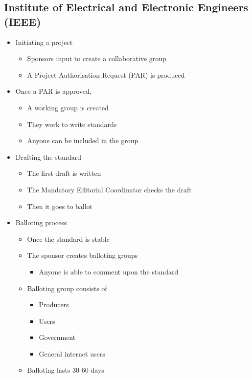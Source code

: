 \subsection*{Institute of Electrical and Electronic Engineers (IEEE)}

\begin{itemize}
  \item Initiating a project
  \begin{itemize}
    \item Sponsors input to create a collaborative group
    \item A Project Authorisation Request (PAR) is produced
  \end{itemize}
  \item Once a PAR is approved,
  \begin{itemize}
    \item A working group is created
    \item They work to write standards
    \item Anyone can be included in the group
  \end{itemize}
  \item Drafting the standard
  \begin{itemize}
    \item The first draft is written
    \item The Mandatory Editorial Coordinator checks the draft
    \item Then it goes to ballot
  \end{itemize}
  \item Balloting process
  \begin{itemize}
    \item Once the standard is stable
    \item The sponsor creates balloting groups
    \begin{itemize}
      \item Anyone is able to comment upon the standard
    \end{itemize}
    \item Balloting group consists of
    \begin{itemize}
      \item Producers
      \item Users
      \item Government
      \item General internet users
    \end{itemize}
    \item Balloting lasts 30-60 days

\end{itemize}
\end{itemize}
